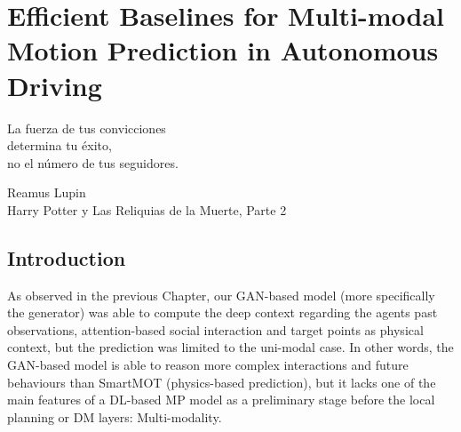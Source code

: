 % 
% 
% 
% 
% 
% 
% 

\chapter{Efficient Baselines for Multi-modal \\ Motion Prediction in Autonomous Driving}
\label{cha:efficient_baseline_for_mp_in_ad}

\begin{FraseCelebre}
	\begin{Frase}
		La fuerza de tus convicciones \\
		determina tu éxito, \\
		no el número de tus seguidores.
	\end{Frase}
	\begin{Fuente}
		Reamus Lupin \\
		Harry Potter y Las Reliquias de la Muerte, Parte 2
	\end{Fuente}
\end{FraseCelebre}

\section{Introduction}
\label{sec:6_introduction}

As observed in the previous Chapter, our \ac{GAN}-based model (more specifically the generator) was able to compute the deep context regarding the agents past observations, attention-based social interaction and target points as physical context, but the prediction was limited to the uni-modal case. In other words, the \ac{GAN}-based model is able to reason more complex interactions and future behaviours than SmartMOT (physics-based prediction), but it lacks one of the main features of a \ac{DL}-based \ac{MP} model as a preliminary stage before the local planning or \ac{DM} layers: Multi-modality. 

